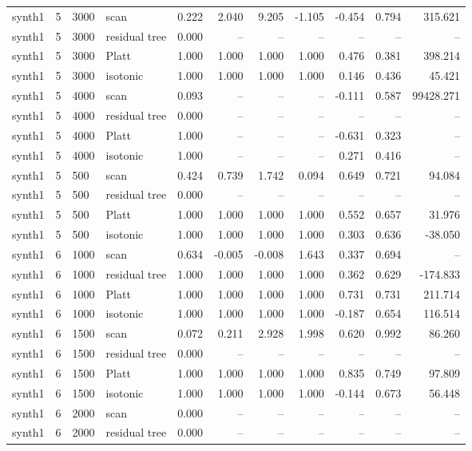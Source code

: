 \begin{tabular}{lrllrrrrrrr}
synth1 & 5 & 3000 & scan & 0.222 & 2.040 & 9.205 & -1.105 & -0.454 & 0.794 & 315.621 \\
synth1 & 5 & 3000 & residual tree & 0.000 & -- & -- & -- & -- & -- & -- \\
synth1 & 5 & 3000 & Platt & 1.000 & 1.000 & 1.000 & 1.000 & 0.476 & 0.381 & 398.214 \\
synth1 & 5 & 3000 & isotonic & 1.000 & 1.000 & 1.000 & 1.000 & 0.146 & 0.436 & 45.421 \\
synth1 & 5 & 4000 & scan & 0.093 & -- & -- & -- & -0.111 & 0.587 & 99428.271 \\
synth1 & 5 & 4000 & residual tree & 0.000 & -- & -- & -- & -- & -- & -- \\
synth1 & 5 & 4000 & Platt & 1.000 & -- & -- & -- & -0.631 & 0.323 & -- \\
synth1 & 5 & 4000 & isotonic & 1.000 & -- & -- & -- & 0.271 & 0.416 & -- \\
synth1 & 5 & 500 & scan & 0.424 & 0.739 & 1.742 & 0.094 & 0.649 & 0.721 & 94.084 \\
synth1 & 5 & 500 & residual tree & 0.000 & -- & -- & -- & -- & -- & -- \\
synth1 & 5 & 500 & Platt & 1.000 & 1.000 & 1.000 & 1.000 & 0.552 & 0.657 & 31.976 \\
synth1 & 5 & 500 & isotonic & 1.000 & 1.000 & 1.000 & 1.000 & 0.303 & 0.636 & -38.050 \\
synth1 & 6 & 1000 & scan & 0.634 & -0.005 & -0.008 & 1.643 & 0.337 & 0.694 & -- \\
synth1 & 6 & 1000 & residual tree & 1.000 & 1.000 & 1.000 & 1.000 & 0.362 & 0.629 & -174.833 \\
synth1 & 6 & 1000 & Platt & 1.000 & 1.000 & 1.000 & 1.000 & 0.731 & 0.731 & 211.714 \\
synth1 & 6 & 1000 & isotonic & 1.000 & 1.000 & 1.000 & 1.000 & -0.187 & 0.654 & 116.514 \\
synth1 & 6 & 1500 & scan & 0.072 & 0.211 & 2.928 & 1.998 & 0.620 & 0.992 & 86.260 \\
synth1 & 6 & 1500 & residual tree & 0.000 & -- & -- & -- & -- & -- & -- \\
synth1 & 6 & 1500 & Platt & 1.000 & 1.000 & 1.000 & 1.000 & 0.835 & 0.749 & 97.809 \\
synth1 & 6 & 1500 & isotonic & 1.000 & 1.000 & 1.000 & 1.000 & -0.144 & 0.673 & 56.448 \\
synth1 & 6 & 2000 & scan & 0.000 & -- & -- & -- & -- & -- & -- \\
synth1 & 6 & 2000 & residual tree & 0.000 & -- & -- & -- & -- & -- & -- \\

\end{tabular}
